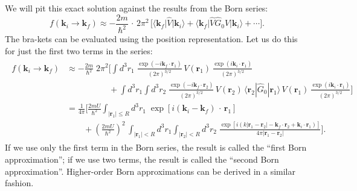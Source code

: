 \documentclass[pra,12pt]{revtex4-2}
\begin{document}
We will pit this exact solution against the results from the Born
series:
\begin{equation}
  f(\mathbf{k}_i\rightarrow \mathbf{k}_f) \approx - \frac{2m}{\hbar^2} \,\cdot \, 2\pi^2 \, \Bigg[\big\langle \mathbf{k}_f\big| \hat{V}|\mathbf{k}_i\big\rangle + \big\langle \mathbf{k}_f \big| \hat{V}\hat{G}_0 \hat{V} \big|\mathbf{k}_i\big\rangle + \cdots \Bigg].
\end{equation}
The bra-kets can be evaluated using the position representation.  Let
us do this for just the first two terms in the series:
\begin{align*}
  \begin{aligned}f(\mathbf{k}_i\rightarrow \mathbf{k}_f) &\approx - \frac{2m}{\hbar^2} \; 2\pi^2 \Bigg[\int d^3r_1\; \frac{\exp(-i\mathbf{k}_f \cdot \mathbf{r}_1)}{(2\pi)^{3/2}} \, V(\mathbf{r}_1) \, \frac{\exp(i\mathbf{k}_i \cdot \mathbf{r}_1)}{(2\pi)^{3/2}} \\&\qquad\qquad\quad + \int d^3r_1 \!\! \int d^3r_2 \; \frac{\exp(-i\mathbf{k}_f \cdot \mathbf{r}_2)}{(2\pi)^{3/2}} \, V(\mathbf{r}_2) \, \langle\mathbf{r}_2|\hat{G}_0|\mathbf{r}_1 \rangle \, V(\mathbf{r}_1)\, \frac{\exp(i\mathbf{k}_i \cdot \mathbf{r}_1)}{(2\pi)^{3/2}}\Bigg] \\ &= \frac{1}{4\pi} \Bigg[\frac{2mU}{\hbar^2} \int_{|\mathbf{r}_1| \le R} d^3r_1 \; \exp\left[i(\mathbf{k}_i-\mathbf{k}_f)\, \cdot\, \mathbf{r}_1\right] \\ &\qquad + \left(\frac{2mU}{\hbar^2}\right)^2\, \int_{|\mathbf{r}_1|<R} d^3 r_1 \int_{|\mathbf{r}_2|<R} d^3 r_2 \; \frac{\exp\left[i(k|\mathbf{r}_1-\mathbf{r}_2| - \mathbf{k}_f \cdot \mathbf{r}_2 +\mathbf{k}_i \cdot \mathbf{r}_1)\right]}{4\pi|\mathbf{r}_1-\mathbf{r}_2|} \Bigg]. \end{aligned}
\end{align*}
If we use only the first term in the Born series, the result is
called the ``first Born approximation''; if we use two terms, the
result is called the ``second Born approximation''.  Higher-order Born
approximations can be derived in a similar fashion.
\end{document}

